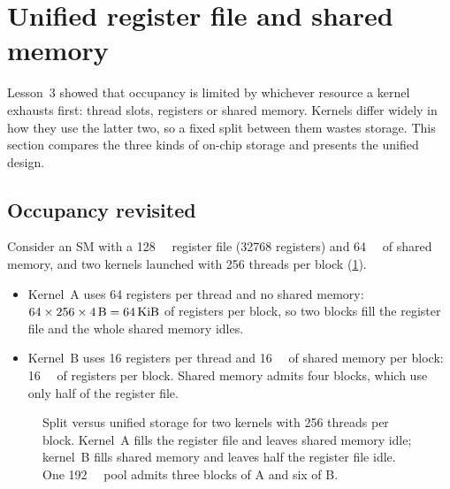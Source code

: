 \documentclass[../main.tex]{subfiles}
\begin{document}
\section{Unified register file and shared memory}
\label{sec:l06-unified}

Lesson~3 showed that occupancy is limited by whichever resource a
kernel exhausts first: thread slots, registers or shared
memory.  Kernels differ widely in how they use the latter two,
so a fixed split between them wastes storage.  This section compares
the three kinds of on-chip storage and presents the unified design.

\subsection{Occupancy revisited}

Consider an SM with a \SI{128}{\kibi\byte} register file (\num{32768}
registers) and \SI{64}{\kibi\byte} of shared memory, and two kernels
launched with 256 threads per block (\cref{fig:l06-unified-pool}).
\begin{itemize}
  \item Kernel~A uses 64 registers per thread and no shared memory:
    $64 \times 256 \times \SI{4}{\byte} = \SI{64}{\kibi\byte}$ of
    registers per block, so two blocks fill the register file and the
    whole shared memory idles.
  \item Kernel~B uses 16 registers per thread and \SI{16}{\kibi\byte}
    of shared memory per block: \SI{16}{\kibi\byte} of registers per
    block.  Shared memory admits four blocks, which use only half of the
    register file.
\end{itemize}

\begin{figure}[tb]
  \centering
  
  \caption{Split versus unified storage for two kernels with 256
    threads per block.  Kernel~A fills the register file and leaves
    shared memory idle; kernel~B fills shared memory and leaves half
    the register file idle.  One \SI{192}{\kibi\byte} pool admits three
    blocks of A and six of B.}
  \label{fig:l06-unified-pool}
\end{figure}
\end{document}
